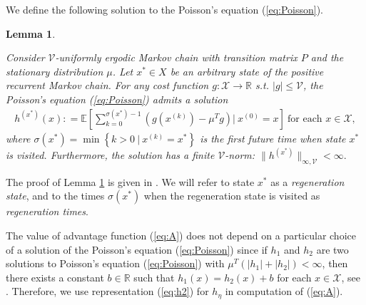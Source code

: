 \documentclass[11pt]{article}
\newcommand{\R}{\mathbb{R}}
\newcommand{\E}{\mathbb{E}}
\newcommand{\X}{\mathcal{X}}
\newcommand{\V}{\mathcal{V}}
\newtheorem{lemma}{Lemma}
\theoremstyle{definition}
\numberwithin{equation}{section}
\begin{document}
We define the following solution to the Poisson's equation (\ref{eq:Poisson}).
\begin{lemma}\label{lem:poisson_sol2}

Consider $\V$-uniformly ergodic  Markov chain with transition matrix $P$ and the stationary  distribution $\mu$. Let $x^*\in X$ be an arbitrary state of the positive recurrent Markov chain.
 For any cost function $g:\X \rightarrow \R$ s.t. $|g|\leq \V$, the Poisson's equation (\ref{eq:Poisson}) admits  a  solution
\begin{align}\label{eq:h2}
h^{(x^*)}(x) : = \E \left[\sum\limits_{k=0}^{\sigma(x^*)-1} \left(g(x^{(k)}) - \mu^Tg\right)\Big|~x^{(0)} = x\right] ~\text{for each }x\in \X,
\end{align}
where $\sigma(x^*) = \min\left\{k>0~|~x^{(k)} = x^*\right\}$ is the first future time when state $x^*$ is visited.
 Furthermore, the solution has a finite $\V$-norm: $\|h^{(x^*)}\|_{\infty, \V}<\infty.$
\end{lemma}
The  proof of Lemma \ref{lem:poisson_sol2} is given in \cite[Proposition A.3.1]{Meyn2007}.  We will  refer to state $x^*$ as a \textit{regeneration state}, and to the times $\sigma(x^*)$ when the regeneration state is visited   as \textit{regeneration times}.

The value of  advantage function (\ref{eq:A}) does not depend on a particular choice of a solution of the Poisson's equation (\ref{eq:Poisson}) since if $h_1$ and $h_2$ are two solutions to Poisson's equation (\ref{eq:Poisson}) with $\mu^T(|h_1|+|h_2|)<\infty$, then there exists a constant $b\in \R$ such that $h_1(x) = h_2(x) +b$ for each $x\in \X$, see \cite[Proposition 17.4.1]{Meyn2009}. Therefore, we use representation (\ref{eq:h2})  for $h_\eta$ in computation of (\ref{eq:A}).



\end{document}
